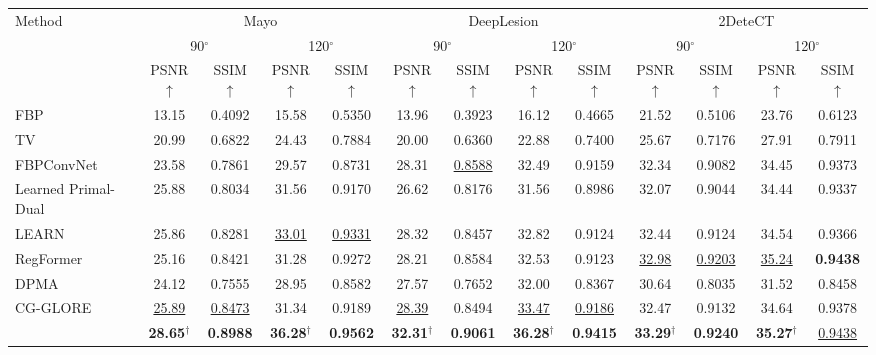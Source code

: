 \begin{tabular}{lcccccccccccc}
\toprule
\multirow{3}{*}{Method} & \multicolumn{4}{c}{Mayo} & \multicolumn{4}{c}{DeepLesion} & \multicolumn{4}{c}{2DeteCT} \\
\cmidrule(lr){2-5} \cmidrule(lr){6-9} \cmidrule(lr){10-13}
 & \multicolumn{2}{c}{90$^\circ$} & \multicolumn{2}{c}{120$^\circ$} & \multicolumn{2}{c}{90$^\circ$} & \multicolumn{2}{c}{120$^\circ$} & \multicolumn{2}{c}{90$^\circ$} & \multicolumn{2}{c}{120$^\circ$} \\
\cmidrule(lr){2-3} \cmidrule(lr){4-5} \cmidrule(lr){6-7} \cmidrule(lr){8-9} \cmidrule(lr){10-11} \cmidrule(lr){12-13}
 & PSNR$\uparrow$ & SSIM$\uparrow$ & PSNR$\uparrow$ & SSIM$\uparrow$ & PSNR$\uparrow$ & SSIM$\uparrow$ & PSNR$\uparrow$ & SSIM$\uparrow$ & PSNR$\uparrow$ & SSIM$\uparrow$ & PSNR$\uparrow$ & SSIM$\uparrow$ \\
\midrule
FBP & 13.15 & 0.4092 & 15.58 & 0.5350 & 13.96 & 0.3923 & 16.12 & 0.4665 & 21.52 & 0.5106 & 23.76 & 0.6123 \\
TV & 20.99 & 0.6822 & 24.43 & 0.7884 & 20.00 & 0.6360 & 22.88 & 0.7400 & 25.67 & 0.7176 & 27.91 & 0.7911 \\
FBPConvNet~\cite{jin2017fbpconvnet} & 23.58 & 0.7861 & 29.57 & 0.8731 & 28.31 & \underline{0.8588} & 32.49 & 0.9159 & 32.34 & 0.9082 & 34.45 & 0.9373 \\
Learned Primal-Dual~\cite{adler2018lpd} & 25.88 & 0.8034 & 31.56 & 0.9170 & 26.62 & 0.8176 & 31.56 & 0.8986 & 32.07 & 0.9044 & 34.44 & 0.9337 \\
LEARN~\cite{chen2018learn} & 25.86 & 0.8281 & \underline{33.01} & \underline{0.9331} & 28.32 & 0.8457 & 32.82 & 0.9124 & 32.44 & 0.9124 & 34.54 & 0.9366 \\
RegFormer~\cite{xia2024regformer} & 25.16 & 0.8421 & 31.28 & 0.9272 & 28.21 & 0.8584 & 32.53 & 0.9123 & \underline{32.98} & \underline{0.9203} & \underline{35.24} & \textbf{0.9438} \\
DPMA~\cite{wu2025dpma} & 24.12 & 0.7555 & 28.95 & 0.8582 & 27.57 & 0.7652 & 32.00 & 0.8367 & 30.64 & 0.8035 & 31.52 & 0.8458 \\
CG-GLORE~\cite{cgglore2026} & \underline{25.89} & \underline{0.8473} & 31.34 & 0.9189 & \underline{28.39} & 0.8494 & \underline{33.47} & \underline{0.9186} & 32.47 & 0.9132 & 34.64 & 0.9378 \\
\midrule
\oursname{} & \textbf{28.65$^\dagger$} & \textbf{0.8988} & \textbf{36.28$^\dagger$} & \textbf{0.9562} & \textbf{32.31$^\dagger$} & \textbf{0.9061} & \textbf{36.28$^\dagger$} & \textbf{0.9415} & \textbf{33.29$^\dagger$} & \textbf{0.9240} & \textbf{35.27$^\dagger$} & \underline{0.9438} \\
\bottomrule
\end{tabular}
